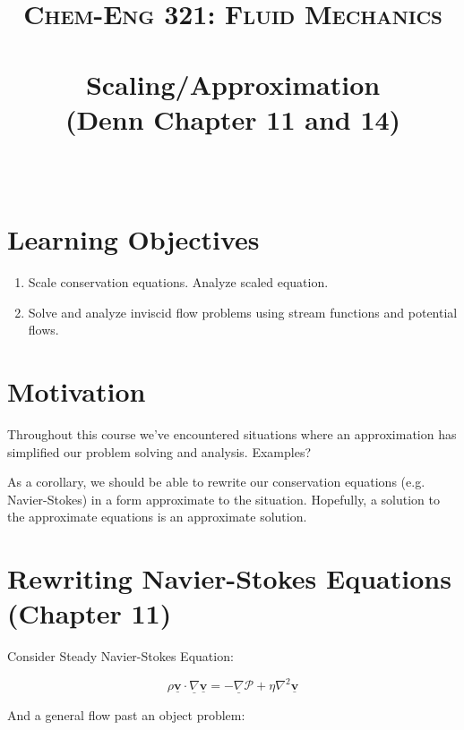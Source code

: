 \documentclass[paper=a4, fontsize=12pt]{scrartcl} %
\author{\vspace{-5ex}}
\date{\vspace{-10ex}}
\title{	
\normalfont \normalsize 
\textsc{Chem-Eng 321: Fluid Mechanics} \\ [10pt] %
\horrule{0.5pt} \\[0.2cm] %
\huge Scaling/Approximation \\ (Denn Chapter 11 and 14) \\ %
\horrule{2pt} \\[0.2cm] %
}
\numberwithin{equation}{section} %
\numberwithin{figure}{section} %
\numberwithin{table}{section} %
\begin{document}
\maketitle %

\thispagestyle{empty}

\section*{Learning Objectives}

\begin{enumerate}
\item Scale conservation equations. Analyze scaled equation. 
\item Solve and analyze inviscid flow problems using stream functions and potential flows.

\end{enumerate}

\section*{Motivation}

Throughout this course we've encountered situations where an approximation has simplified our problem solving and analysis. Examples?

As a corollary, we should be able to rewrite our conservation equations (e.g. Navier-Stokes) in a form approximate to the situation. Hopefully, a solution to the approximate equations is an approximate solution. 

\section*{Rewriting Navier-Stokes Equations (Chapter 11)}

Consider Steady Navier-Stokes Equation:

\vspace{2ex} \begin{equation*}
\rho \underline{\mathbf{v}} \cdot \underline{\nabla}  \underline{\mathbf{v}} = -\underline{\nabla} \mathcal{P}+\eta \nabla^2 \underline{\mathbf{v}} 
\end{equation*}

And a general flow past an object problem:
\end{document}
